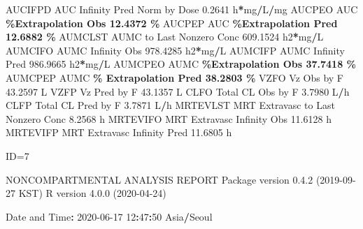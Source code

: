 \documentclass[
  12pt,
]{krantz}
\newenvironment{Shaded}{\begin{snugshade}}{\end{snugshade}}
\newcommand{\DecValTok}[1]{\textcolor[rgb]{0.00,0.00,0.81}{#1}}
\newcommand{\FloatTok}[1]{\textcolor[rgb]{0.00,0.00,0.81}{#1}}
\newcommand{\NormalTok}[1]{#1}
\newcommand{\OperatorTok}[1]{\textcolor[rgb]{0.81,0.36,0.00}{\textbf{#1}}}
\newcommand{\StringTok}[1]{\textcolor[rgb]{0.31,0.60,0.02}{#1}}
\begin{document}
\begin{Shaded}
\begin{Highlighting}[]
\NormalTok{AUCIFPD    AUC Infinity Pred Norm by Dose                  }\FloatTok{0.2641}\NormalTok{ h}\OperatorTok{*}\NormalTok{mg}\OperatorTok{/}\NormalTok{L}\OperatorTok{/}\NormalTok{mg}
\NormalTok{AUCPEO     AUC }\OperatorTok{\%Extrapolation Obs                         12.4372 \%}
\NormalTok{AUCPEP     AUC }\OperatorTok{\%Extrapolation Pred                        12.6882 \%}
\NormalTok{AUMCLST    AUMC to Last Nonzero Conc                     }\FloatTok{609.1524}\NormalTok{ h2}\OperatorTok{*}\NormalTok{mg}\OperatorTok{/}\NormalTok{L}
\NormalTok{AUMCIFO    AUMC Infinity Obs                             }\FloatTok{978.4285}\NormalTok{ h2}\OperatorTok{*}\NormalTok{mg}\OperatorTok{/}\NormalTok{L}
\NormalTok{AUMCIFP    AUMC Infinity Pred                            }\FloatTok{986.9665}\NormalTok{ h2}\OperatorTok{*}\NormalTok{mg}\OperatorTok{/}\NormalTok{L}
\NormalTok{AUMCPEO    AUMC }\OperatorTok{\%Extrapolation Obs                        37.7418 \%}
\NormalTok{AUMCPEP    AUMC }\OperatorTok{\% Extrapolation Pred                      38.2803 \%}
\NormalTok{VZFO       Vz Obs by F                                    }\FloatTok{43.2597}\NormalTok{ L}
\NormalTok{VZFP       Vz Pred by F                                   }\FloatTok{43.1357}\NormalTok{ L}
\NormalTok{CLFO       Total CL Obs by F                               }\FloatTok{3.7980}\NormalTok{ L}\OperatorTok{/}\NormalTok{h}
\NormalTok{CLFP       Total CL Pred by F                              }\FloatTok{3.7871}\NormalTok{ L}\OperatorTok{/}\NormalTok{h}
\NormalTok{MRTEVLST   MRT Extravasc to Last Nonzero Conc              }\FloatTok{8.2568}\NormalTok{ h}
\NormalTok{MRTEVIFO   MRT Extravasc Infinity Obs                     }\FloatTok{11.6128}\NormalTok{ h}
\NormalTok{MRTEVIFP   MRT Extravasc Infinity Pred                    }\FloatTok{11.6805}\NormalTok{ h}





\NormalTok{ID=}\DecValTok{7}

\NormalTok{                        NONCOMPARTMENTAL ANALYSIS REPORT}
\NormalTok{                       Package version }\DecValTok{0}\NormalTok{.}\FloatTok{4.2}\NormalTok{ (}\DecValTok{2019{-}09{-}27}\NormalTok{ KST)}
\NormalTok{                          R version }\DecValTok{4}\NormalTok{.}\FloatTok{0.0}\NormalTok{ (}\DecValTok{2020{-}04{-}24}\NormalTok{)}

\NormalTok{Date and Time}\OperatorTok{:}\StringTok{ }\DecValTok{2020{-}06{-}17} \DecValTok{12}\OperatorTok{:}\DecValTok{47}\OperatorTok{:}\DecValTok{50}\NormalTok{ Asia}\OperatorTok{/}\NormalTok{Seoul}


\end{Highlighting}
\end{Shaded}
\end{document}
